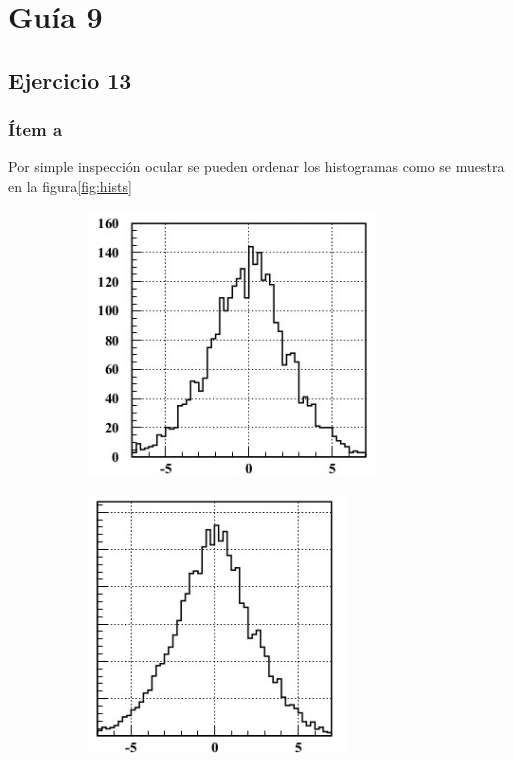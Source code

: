 \section*{Guía 9}
\subsection*{Ejercicio 13}
\subsubsection*{Ítem a}
Por simple inspección ocular se pueden ordenar los histogramas como se muestra en la figura\ref{fig:hists}
\begin{figure}
\centering
\begin{subfigure}[b]{0.3\textwidth}
\includegraphics[width=0.84\textwidth]{hist3.jpg}
\end{subfigure}
\begin{subfigure}[b]{0.3\textwidth}
\includegraphics[width=0.75\textwidth]{hist2.jpg}

\end{subfigure}
\end{figure}
